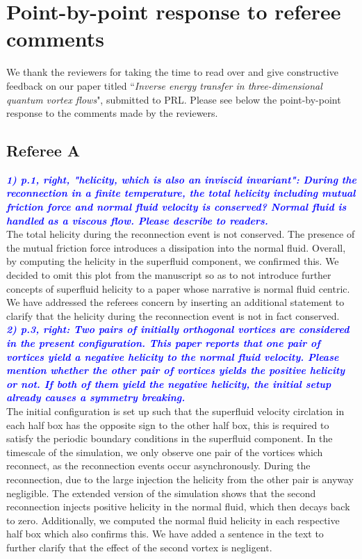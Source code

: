 \documentclass[a4paper,10pt]{article}
\def\blue#1{\textcolor{blue}{#1}}
\def\refcomment#1{\textbf{\blue{\emph{#1}}}\\}
\begin{document}
\section*{\centering Point-by-point response to referee comments}

We thank the reviewers for taking the time to read over and give constructive feedback on our paper titled “\emph{Inverse energy transfer in three-dimensional quantum vortex flows}", submitted to PRL. Please see below the point-by-point response to the comments made by the reviewers.

\subsection*{Referee A}


    \refcomment{1) p.1, right, "helicity, which is also an inviscid invariant": During
    the reconnection in a finite temperature, the total helicity including
    mutual friction force and normal fluid velocity is conserved? Normal
    fluid is handled as a viscous flow. Please describe to readers.}

    The total helicity during the reconnection event is not conserved. The presence of the mutual friction force introduces a dissipation into the normal fluid. Overall, by computing the helicity in the superfluid component, we confirmed this. We decided to omit this plot from the manuscript so as to not introduce further concepts of superfluid helicity to a paper whose narrative is normal fluid centric. We have addressed the referees concern by inserting an additional statement to clarify that the helicity during the reconnection event is not in fact conserved. \\

    \refcomment{2) p.3, right: Two pairs of initially orthogonal vortices are
    considered in the present configuration. This paper reports that one
    pair of vortices yield a negative helicity to the normal fluid
    velocity. Please mention whether the other pair of vortices yields the
    positive helicity or not. If both of them yield the negative helicity,
    the initial setup already causes a symmetry breaking.}

    The initial configuration is set up such that the superfluid velocity circlation in each half box has the opposite sign to the other half box, this is required to satisfy the periodic boundary conditions in the superfluid component. In the timescale of the simulation, we only observe one pair of the vortices which reconnect, as the reconnection events occur asynchronously. During the reconnection, due to the large injection the helicity from the other pair is anyway negligible. The extended version of the simulation shows that the second reconnection injects positive helicity in the normal fluid, which then decays back to zero. Additionally, we computed the normal fluid helicity in each respective half box which also confirms this. We have added a sentence in the text to further clarify that the effect of the second vortex is negligent. 
    
\end{document}

